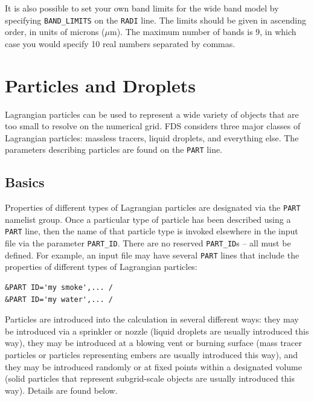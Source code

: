 \documentclass[11pt]{book}
\newcommand{\ct}{\tt\small}
\begin{document}
It is also possible to set your own band limits for the wide band model by specifying {\ct BAND\_LIMITS} on the {\ct RADI} line. The limits should be given in ascending order, in units of microns ($\mu$m). The maximum number of bands is 9, in which case you would specify 10 real numbers separated by commas.









\chapter{Particles and Droplets}
\label{info:PART}


Lagrangian particles can be used to represent a wide variety of objects that are too small to resolve on the numerical grid. FDS considers three major classes of Lagrangian particles: massless tracers, liquid droplets, and everything else. The parameters describing particles are found on the {\ct PART} line.



\section{Basics}
\label{info:PART_Basics}

Properties of different types of
Lagrangian particles are designated via the {\ct PART} namelist group.
Once a particular type of particle has been described using
a {\ct PART} line, then the name of that particle type is invoked
elsewhere in the input file via the parameter {\ct PART\_ID}. There are no reserved {\ct PART\_ID}s -- all must be defined.
For example, an input file may have several {\ct PART} lines that include the
properties of different types of Lagrangian particles:

\footnotesize
\begin{verbatim}
&PART ID='my smoke',... /
&PART ID='my water',... /
\end{verbatim}
\normalsize

\noindent
Particles are introduced into the calculation in several different ways: they may be introduced via a sprinkler or nozzle (liquid droplets are usually introduced this way), they may be introduced at a blowing vent or burning surface (mass tracer particles or particles representing embers are usually introduced this way), and they may be introduced randomly or at fixed points within a designated volume (solid particles that represent subgrid-scale objects are usually introduced this way). Details are found below.
\end{document}
